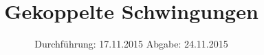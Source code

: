 

\subject{VERSUCH NUMMER 355 (Korrektur)}
\title{Gekoppelte Schwingungen}
\date{
  Durchführung: 17.11.2015
  \hspace{3em}
  Abgabe: 24.11.2015}



\maketitle
\thispagestyle{empty}
\tableofcontents
\newpage






\printbibliography


